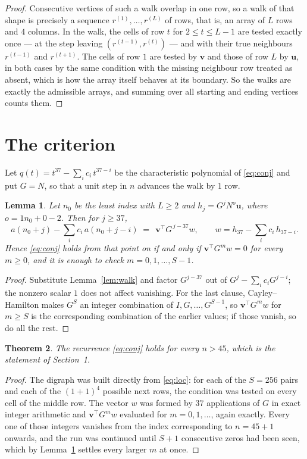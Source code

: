 \documentclass[11pt,a4paper]{article}
\theoremstyle{plain}
\newtheorem{theorem}{Theorem}
\newtheorem{lemma}[theorem]{Lemma}
\theoremstyle{definition}
\begin{document}
\begin{proof}
Consecutive vertices of such a walk overlap in one row, so a walk of that shape is
precisely a sequence $r^{(1)},\dots,r^{(L)}$ of rows, that is, an array of $L$ rows
and $4$ columns. In the walk, the cells of row $t$ for $2\le t\le L-1$ are tested
exactly once --- at the step leaving $(r^{(t-1)},r^{(t)})$ --- and with their true
neighbours $r^{(t-1)}$ and $r^{(t+1)}$. The cells of row $1$ are tested by
$\mathbf{v}$ and those of row $L$ by $\mathbf{u}$, in both cases by the same condition
with the missing neighbour row treated as absent, which is how the array itself behaves at
its boundary. So the walks are exactly the admissible arrays, and summing over all starting
and ending vertices counts them.
\end{proof}

\section{The criterion}

Let $q(t)=t^{37}-\sum_i c_i\,t^{37-i}$ be the characteristic polynomial of
\eqref{eq:conj} and put $G=N$, so that a unit step in $n$ advances the walk by
$1$ row.

\begin{lemma}\label{lem:crit}
Let $n_0$ be the least index with $L\ge2$ and $h_j=G^{j}N^{o}\mathbf{u}$, where
$o=1n_0+0-2$. Then for $j\ge37$,
\[
a(n_0+j)-\sum_i c_i\,a(n_0+j-i)\;=\;\,\mathbf{v}^{\!\top}G^{\,j-37}w,
\qquad w=h_{37}-\sum_i c_i\,h_{37-i} .
\]
Hence \eqref{eq:conj} holds from that point on if and only if
$\mathbf{v}^{\!\top}G^{m}w=0$ for every $m\ge0$, and it is enough to check
$m=0,1,\dots,S-1$.
\end{lemma}

\begin{proof}
Substitute Lemma~\ref{lem:walk} and factor $G^{j-37}$ out of
$G^{j}-\sum_ic_iG^{j-i}$; the nonzero scalar $1$ does not affect
vanishing. For the last clause, Cayley--Hamilton makes $G^{S}$ an integer combination of
$I,G,\dots,G^{S-1}$, so $\mathbf{v}^{\!\top}G^{m}w$ for $m\ge S$ is the corresponding
combination of the earlier values; if those vanish, so do all the rest.
\end{proof}

\begin{theorem}
The recurrence \eqref{eq:conj} holds for every $n>45$, which is the statement of
Section~1.
\end{theorem}

\begin{proof}
The digraph was built directly from \eqref{eq:loc}: for each of the $S=256$ pairs and each
of the $(1+1)^{4}$ possible next rows, the condition was tested on every cell of
the middle row. The vector $w$ was formed by $37$ applications of $G$ in exact integer
arithmetic and $\mathbf{v}^{\!\top}G^{m}w$ evaluated for $m=0,1,\dots$, again exactly.
Every one of those integers vanishes from the index corresponding to $n=45+1$ onwards,
and the run was continued until $S+1$ consecutive zeros had been seen, which by
Lemma~\ref{lem:crit} settles every larger $m$ at once.
\end{proof}
\end{document}
